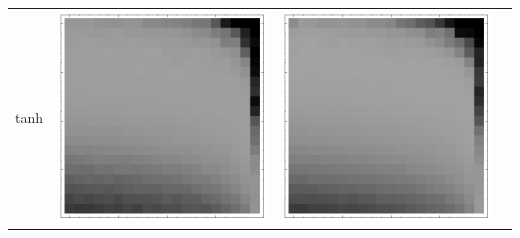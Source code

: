 \documentclass[10pt]{article}
\begin{document}
\begin{tabular}{|c|c|c|c|}
tanh
        & \includegraphics[scale=0.25]{plots/simple/LF-20T10T-20T10-MNIST-6.png}
        & \includegraphics[scale=0.25]{plots/simple/LF-40T10T-20T10-MNIST-6.png}

\end{tabular}
\end{document}
